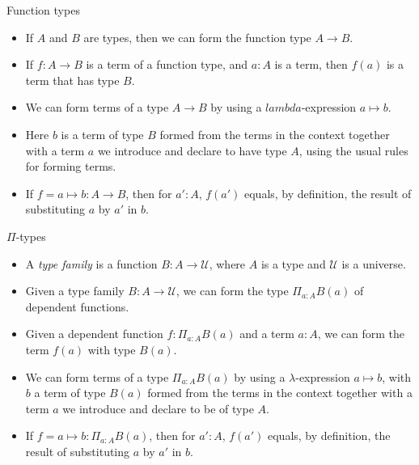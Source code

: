 \documentclass[10 pt., handout]{beamer}
\theoremstyle{plain}
\theoremstyle{remark}
\newcommand{\U}{\mathcal{U}}
\begin{document}
\begin{frame}{Function types}

\begin{itemize}

\item If $A$ and $B$ are types, then we can form the function type $A \to B$.

\item If $f : A \to B$ is a term of a function type, and $a : A$ is a term, then $f(a)$ is a term that has type $B$.

\item We can form terms of a type $A \to B$ by using a $lambda$-expression $a \mapsto b$.

\item Here $b$ is a term of type $B$ formed from the terms in the context together with a term $a$ we introduce and declare to have type $A$, using the usual rules for forming terms.

\item If $f = a \mapsto b : A \to B$, then for $a' : A$, $f(a')$ equals, by definition, the result of substituting $a$ by $a'$ in $b$.

\end{itemize}

\end{frame}


\begin{frame}{$\Pi$-types}

\begin{itemize}

\item A \emph{type family} is a function $B : A \to \U$, where $A$ is a type and $\U$ is a universe.

\item Given a type family $B : A \to \U$, we can form the type $\Pi_{a : A} B(a)$ of dependent functions.

\item Given a dependent function $f : \Pi_{a : A} B(a)$ and a term $a : A$, we can form the term $f(a)$ with type $B(a)$.

\item We can form terms of a type $\Pi_{a : A} B(a)$ by using a $\lambda$-expression $a ↦ b$, with $b$ a term of type $B(a)$ formed from the terms in the context together with a term $a$ we introduce and declare to be of type $A$.

\item If $f = a \mapsto b : \Pi_{a: A} B(a)$, then for $a' : A$, $f(a')$ equals, by definition, the result of substituting $a$ by $a'$ in $b$.


\end{itemize}

\end{frame}
\end{document}
